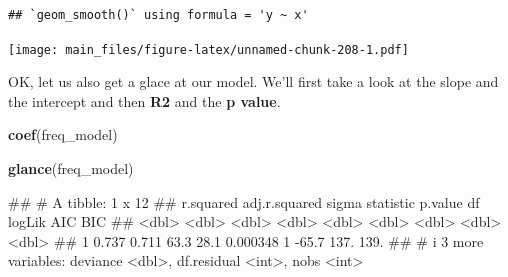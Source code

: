 \documentclass[
]{book}
\newenvironment{Shaded}{\begin{snugshade}}{\end{snugshade}}
\newcommand{\FunctionTok}[1]{\textcolor[rgb]{0.13,0.29,0.53}{\textbf{#1}}}
\newcommand{\NormalTok}[1]{#1}
\newcommand{\OtherTok}[1]{\textcolor[rgb]{0.56,0.35,0.01}{#1}}
\newcommand{\SpecialCharTok}[1]{\textcolor[rgb]{0.81,0.36,0.00}{\textbf{#1}}}
\begin{document}
\begin{verbatim}
## `geom_smooth()` using formula = 'y ~ x'
\end{verbatim}

\texttt{[image: main\_files/figure-latex/unnamed-chunk-208-1.pdf]}

\begin{Shaded}
\end{Shaded}

OK, let us also get a glace at our model. We'll first take a look at the slope and the intercept and then \textbf{R2} and the \textbf{p value}.

\begin{Shaded}
\begin{Highlighting}[]
\FunctionTok{coef}\NormalTok{(freq\_model)}
\end{Highlighting}
\end{Shaded}

\begin{Shaded}
\end{Shaded}

\begin{Shaded}
\begin{Highlighting}[]
\FunctionTok{glance}\NormalTok{(freq\_model)}
\end{Highlighting}
\end{Shaded}

\begin{Shaded}
\begin{Highlighting}[]
\NormalTok{\#\# \# A tibble: 1 x 12}
\NormalTok{\#\#   r.squared adj.r.squared sigma statistic  p.value    df logLik   AIC   BIC}
\NormalTok{\#\#       \textless{}dbl\textgreater{}         \textless{}dbl\textgreater{} \textless{}dbl\textgreater{}     \textless{}dbl\textgreater{}    \textless{}dbl\textgreater{} \textless{}dbl\textgreater{}  \textless{}dbl\textgreater{} \textless{}dbl\textgreater{} \textless{}dbl\textgreater{}}
\NormalTok{\#\# 1     0.737         0.711  63.3      28.1 0.000348     1  {-}65.7  137.  139.}
\NormalTok{\#\# \# i 3 more variables: deviance \textless{}dbl\textgreater{}, df.residual \textless{}int\textgreater{}, nobs \textless{}int\textgreater{}}
\end{Highlighting}
\end{Shaded}
\end{document}
